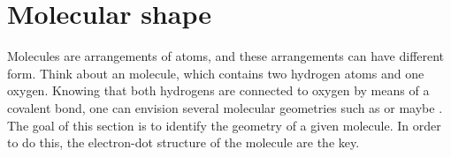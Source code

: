 \documentclass[main.tex]{subfiles}
\begin{document}
\section{Molecular shape}
Molecules are arrangements of atoms, and these arrangements can have different form. Think about an  molecule, which contains two hydrogen atoms and one oxygen. Knowing that both hydrogens are connected to oxygen by means of a covalent bond, one can envision several molecular geometries such as \hspace{.05in} \hspace{.05in} or maybe \hspace{.05in}\hspace{.05in}. The goal of this section is to identify the geometry of a given molecule. In order to do this, the electron-dot structure of the molecule are the key.
\sloppy 
\end{document}

